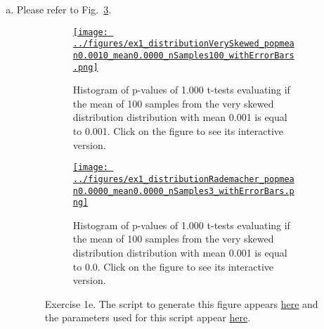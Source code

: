 \documentclass[12pt]{article}
\def\fig_width{3.5in}
\begin{document}
\begin{enumerate}[(a)]
\begin{figure}[H]
\begin{center}
            \end{center}
        \end{figure}

    \item  Please refer to Fig.~\ref{fig:ex1e}.

        \begin{figure}[H]
            \begin{center}

                \begin{subfigure}{1.0\textwidth}
                    \centering
                    \href{https://www.gatsby.ucl.ac.uk/~rapela/neuroinformatics/2023/ws1/figures/ex1_distributionVerySkewed_popmean0.0010_mean0.0000_nSamples100_withErrorBars.html}{\texttt{[image: ../figures/ex1\_distributionVerySkewed\_popmean0.0010\_mean0.0000\_nSamples100\_withErrorBars.png]}}

                    \caption{Histogram of p-values of 1.000 t-tests evaluating
                    if the mean of 100 samples from the very skewed
                    distribution distribution with mean 0.001 is equal to
                    0.001.  Click on the figure to see its interactive
                    version.}

                    \label{fig:ex1e_1}
                \end{subfigure}

                \begin{subfigure}{1.0\textwidth}
                    \centering
                    \href{https://www.gatsby.ucl.ac.uk/~rapela/neuroinformatics/2023/ws1/figures/ex1_distributionRademacher_popmean0.0000_mean0.0000_nSamples3_withErrorBars.html}{\texttt{[image: ../figures/ex1\_distributionRademacher\_popmean0.0000\_mean0.0000\_nSamples3\_withErrorBars.png]}}

                    \caption{Histogram of p-values of 1.000 t-tests evaluating
                    if the mean of 100 samples from the very skewed
                    distribution distribution with mean 0.001 is equal to 0.0.
                    Click on the figure to see its interactive version.}

                    \label{fig:ex1e_2}
                \end{subfigure}

                \caption{Exercise 1e.
                The script to generate this figure appears
                \href{https://github.com/joacorapela/neuroinformatics23/blob/master/worksheets/ws1/mySolution/code/scripts/doEx1WithErrorBars.py}{here} and the
                parameters used for this script appear
                \href{https://github.com/joacorapela/neuroinformatics23/blob/master/worksheets/ws1/mySolution/code/scripts/doEx1eWithErrorBars.csh}{here}.}
                \label{fig:ex1e}

            \end{center}
        \end{figure}

\end{enumerate}
\end{document}
